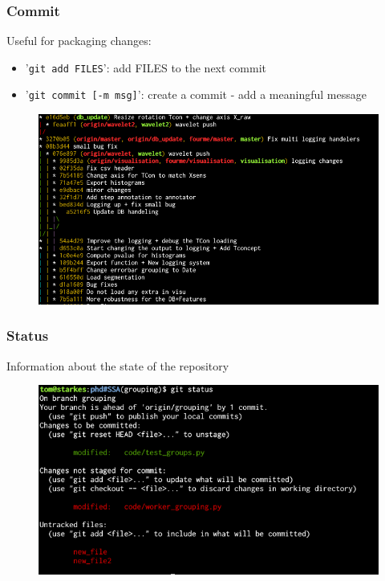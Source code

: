 \documentclass{beamer}
\newcommand{\shellcmd}[1]{'\texttt{\footnotesize #1}'}
\begin{document}
\begin{frame}
    \frametitle{Commit}
    Useful for packaging changes:
    \begin{itemize}
	    \item \shellcmd{git add FILES}: add FILES to the next commit
	    \item \shellcmd{git commit [-m msg]}: create a commit - add a meaningful message
    \end{itemize}
    \begin{figure}[htp]
    \centering
    \includegraphics[width=\textwidth]{commit}
    \end{figure}
\end{frame}

\begin{frame}
	\frametitle{Status}
	Information about the state of the repository
    \begin{figure}[htp]
        \centering
        \includegraphics[width=\textwidth]{status}
    \end{figure}
\end{frame}
\end{document}
